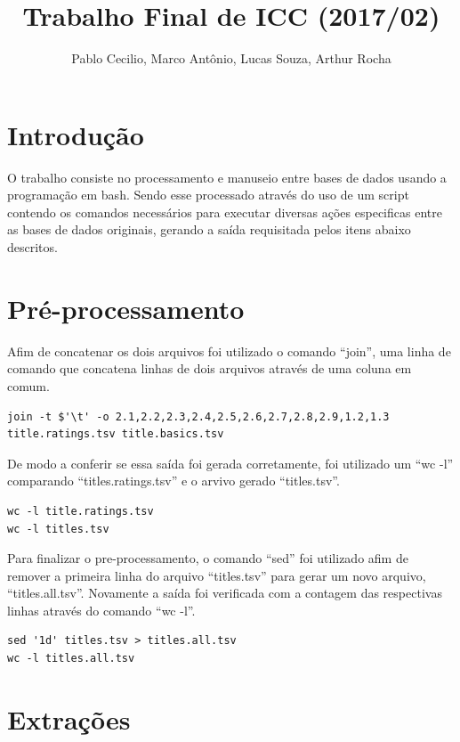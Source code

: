 \documentclass[12pt]{article}
\title{Trabalho Final de ICC (2017/02)}
\author{Pablo Cecilio, Marco Antônio, Lucas Souza, Arthur Rocha}
\date{}
\begin{document}
\maketitle

\section{Introdução}

O trabalho consiste no processamento e manuseio entre bases de dados usando a programação em bash. Sendo esse processado através do uso de um script contendo os comandos necessários para executar diversas ações especificas entre as bases de dados originais, gerando a saída requisitada pelos itens abaixo descritos.

\section{Pré-processamento}

Afim de concatenar os dois arquivos foi utilizado o comando ``join'', uma linha de comando que concatena linhas de dois arquivos através de uma coluna em comum.

\begin{verbatim}
join -t $'\t' -o 2.1,2.2,2.3,2.4,2.5,2.6,2.7,2.8,2.9,1.2,1.3 title.ratings.tsv title.basics.tsv
\end{verbatim}

De modo a conferir se essa saída foi gerada corretamente, foi utilizado um ``wc -l'' comparando ``titles.ratings.tsv'' e o arvivo gerado ``titles.tsv''.

\begin{verbatim}
wc -l title.ratings.tsv
wc -l titles.tsv
\end{verbatim}

Para finalizar o pre-processamento, o comando ``sed'' foi utilizado afim de remover a primeira linha do arquivo ``titles.tsv'' para gerar um novo arquivo, ``titles.all.tsv''. Novamente a saída foi verificada com a contagem das respectivas linhas através do comando ``wc -l''.

\begin{verbatim}
sed '1d' titles.tsv > titles.all.tsv
wc -l titles.all.tsv
\end{verbatim}

\section{Extrações}
\end{document}

